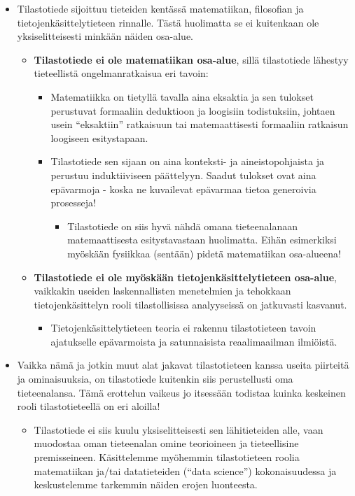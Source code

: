 \documentclass[
]{book}
\providecommand{\tightlist}{%
  \setlength{\itemsep}{0pt}\setlength{\parskip}{0pt}}
\begin{document}
\hfill\break

\begin{itemize}
\tightlist
\item
  Tilastotiede sijoittuu tieteiden kentässä matematiikan, filosofian ja tietojenkäsittelytieteen rinnalle. Tästä huolimatta se ei kuitenkaan ole yksiselitteisesti minkään näiden osa-alue.

  \begin{itemize}
  \tightlist
  \item
    \textbf{Tilastotiede ei ole matematiikan osa-alue}, sillä tilastotiede lähestyy tieteellistä ongelmanratkaisua eri tavoin:

    \begin{itemize}
    \tightlist
    \item
      Matematiikka on tietyllä tavalla aina eksaktia ja sen tulokset perustuvat formaaliin deduktioon ja loogisiin todistuksiin, johtaen usein ``eksaktiin'' ratkaisuun tai matemaattisesti formaaliin ratkaisun loogiseen esitystapaan.
    \item
      Tilastotiede sen sijaan on aina konteksti- ja aineistopohjaista ja perustuu induktiiviseen päättelyyn. Saadut tulokset ovat aina epävarmoja - koska ne kuvailevat epävarmaa tietoa generoivia prosesseja!

      \begin{itemize}
      \tightlist
      \item
        Tilastotiede on siis hyvä nähdä omana tieteenalanaan matemaattisesta esitystavastaan huolimatta. Eihän esimerkiksi myöskään fysiikkaa (sentään) pidetä matematiikan osa-alueena!
      \end{itemize}
    \end{itemize}
  \item
    \textbf{Tilastotiede ei ole myöskään tietojenkäsittelytieteen osa-alue}, vaikkakin useiden laskennallisten menetelmien ja tehokkaan tietojenkäsittelyn rooli tilastollisissa analyyseissä on jatkuvasti kasvanut.

    \begin{itemize}
    \tightlist
    \item
      Tietojenkäsittelytieteen teoria ei rakennu tilastotieteen tavoin ajatukselle epävarmoista ja satunnaisista reaalimaailman ilmiöistä.
    \end{itemize}
  \end{itemize}
\item
  Vaikka nämä ja jotkin muut alat jakavat tilastotieteen kanssa useita piirteitä ja ominaisuuksia, on tilastotiede kuitenkin siis perustellusti oma tieteenalansa. Tämä erottelun vaikeus jo itsessään todistaa kuinka keskeinen rooli tilastotieteellä on eri aloilla!

  \begin{itemize}
  \tightlist
  \item
    Tilastotiede ei siis kuulu yksiselitteisesti sen lähitieteiden alle, vaan muodostaa oman tieteenalan omine teorioineen ja tieteellisine premisseineen. Käsittelemme myöhemmin tilastotieteen roolia matematiikan ja/tai datatieteiden (``data science'') kokonaisuudessa ja keskustelemme tarkemmin näiden erojen luonteesta.
  \end{itemize}
\end{itemize}
\end{document}
